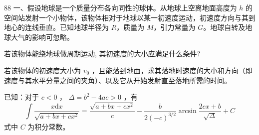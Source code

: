 \begin{problem}[第35届全国中学生物理竞赛复赛][引力场运动与轨道]{88}
一、假设地球是一个质量分布各向同性的球体。从地球上空离地面高度为 $h$ 的空间站发射一个小物体，该物体相对于地球以某一初速度运动，初速度方向与其到地心的连线垂直。已知地球半径为 $R$，质量为 $M$，引力常量为 $G$。地球自转及地球大气的影响可忽略。
\begin{subproblem}
若该物体能绕地球做周期运动, 其初速度的大小应满足什么条件?
\end{subproblem}
\begin{subproblem}
若该物体的初速度大小为 $v_{0}$ ，且能落到地面，求其落地时速度的大小和方向（即速度与其水平分量之间的夹角）、以及它从开始发射直至落地所需的时间。

已知：对于 $c < 0$ ， $\Delta = b^{2} - 4ac > 0$ ，有
\begin{equation}
\int \frac {x \mathrm{d} x}{\sqrt {a + b x + c x ^ {2}}} = \frac {\sqrt {a + b x + c x ^ {2}}}{c} - \frac {b}{2 (- c) ^ {3 / 2}} \arcsin \frac {2 c x + b}{\sqrt {\Delta}} + C
\label{eq:1.p88}
\end{equation}
式中 $C$ 为积分常数。
\end{subproblem}
\end{problem}
